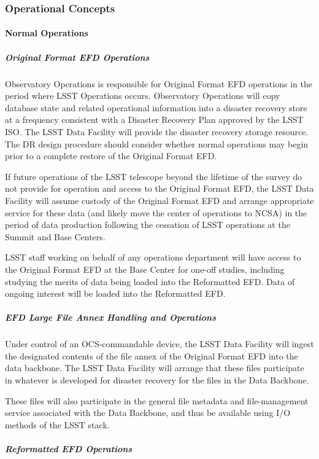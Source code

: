 \subsubsection{Operational Concepts}

\paragraph{Normal Operations}

\subparagraph{Original Format EFD Operations}

Observatory Operations is responsible for Original Format EFD
operations in the period where LSST Operations occurs. Observatory
Operations will copy database state and related operational
information into a disaster recovery store at a frequency consistent
with a Disaster Recovery Plan approved by the LSST ISO. The LSST Data
Facility will provide the disaster recovery storage resource. The DR
design procedure should consider whether normal operations may begin
prior to a complete restore of the Original Format EFD.

If future operations of the LSST telescope beyond the lifetime of the
survey do not provide for operation and access to the Original Format
EFD, the LSST Data Facility will assume custody of the Original Format
EFD and arrange appropriate service for these data (and likely move
the center of operations to NCSA) in the period of data production
following the cessation of LSST operations at the Summit and Base
Centers.

LSST staff working on behalf of any operations department will have
access to the Original Format EFD at the Base Center for one-off
studies, including studying the merits of data being loaded into the
Reformatted EFD. Data of ongoing interest will be loaded into the
Reformatted EFD.

\subparagraph{EFD Large File Annex Handling and Operations}

Under control of an OCS-commandable device, the LSST Data Facility will
ingest the designated contents of the file annex of the Original
Format EFD into the data backbone. The LSST Data Facility will arrange that these
files participate in whatever is developed for disaster recovery for the
files in the Data Backbone.

These files will also participate in the general file metadata and
file-management service associated with the Data Backbone, and thus be
available using I/O methods of the LSST stack.

\subparagraph{Reformatted EFD Operations}

